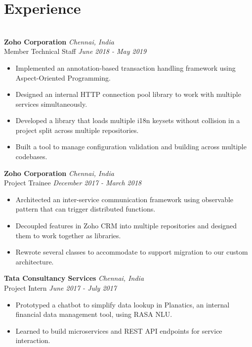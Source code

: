 \documentclass{resume}
\begin{document}
\section*{Experience}
\titlerule
\noindent
\\
\textbf{Zoho Corporation} \hfill \textit{Chennai, India} \\
{\small Member Technical Staff} \hfill \textit{\small June 2018 - May 2019}
\begin{itemize}
  \item Implemented an annotation-based transaction handling framework using Aspect-Oriented Programming.
  \item Designed an internal HTTP connection pool library to work with multiple services simultaneously.
  \item Developed a library that loads multiple i18n keysets without collision in a project split across multiple repositories.
  \item Built a tool to manage configuration validation and building across multiple codebases.
\end{itemize}
\textbf{Zoho Corporation} \hfill \textit{Chennai, India} \\
{\small Project Trainee} \hfill \textit{\small December 2017 - March 2018}
\begin{itemize}
  \item Architected an inter-service communication framework using observable pattern that can trigger distributed functions.
  \item Decoupled features in Zoho CRM into multiple repositories and designed them to work together as libraries.
  \item Rewrote several classes to accommodate to support migration to our custom architecture.
\end{itemize}
\textbf{Tata Consultancy Services} \hfill \textit{Chennai, India} \\
{\small Project Intern} \hfill \textit{\small June 2017 - July 2017}
\begin{itemize}
  \item Prototyped a chatbot to simplify data lookup in Planatics, an internal financial data management tool, using RASA NLU.
  \item Learned to build microservices and REST API endpoints for service interaction.
\end{itemize}
\end{document}
